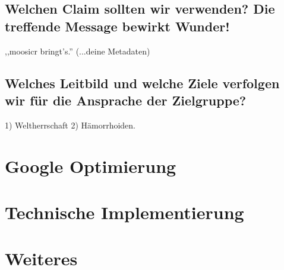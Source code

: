 \documentclass[11pt]{scrreprt}
\begin{document}
\section{Welchen Claim sollten wir verwenden?
Die treffende Message bewirkt Wunder!}

,,moosicr bringt's.'' (...deine Metadaten)

\section{Welches Leitbild und welche Ziele verfolgen wir
für die Ansprache der Zielgruppe?}

1) Weltherrschaft
2) Hämorrhoiden.

\chapter{Google Optimierung}

\chapter{Technische Implementierung}
\chapter{Weiteres}
\end{document}
